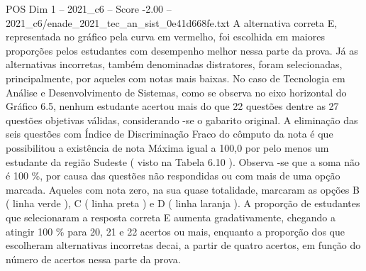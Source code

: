 \begin{textsample}{POS Dim 1 – 2021\_c6 – Score -2.00 – 2021\_c6/enade\_2021\_tec\_an\_sist\_0e41d668fe.txt}
A alternativa correta E, representada no gráfico pela curva em vermelho, foi escolhida em maiores proporções pelos estudantes com desempenho melhor nessa parte da prova.
Já as alternativas incorretas, também denominadas distratores, foram selecionadas, principalmente, por aqueles com notas mais baixas.
No caso de Tecnologia em Análise e Desenvolvimento de Sistemas, como se observa no eixo horizontal do Gráfico 6.5, nenhum estudante acertou mais do que 22 questões dentre as 27 questões objetivas válidas, considerando -se o gabarito original.
A eliminação das seis questões com Índice de Discriminação Fraco do cômputo da nota é que possibilitou a existência de nota Máxima igual a 100,0 por pelo menos um estudante da região Sudeste ( visto na Tabela 6.10 ).
Observa -se que a soma não é 100 \%, por causa das questões não respondidas ou com mais de uma opção marcada.
Aqueles com nota zero, na sua quase totalidade, marcaram as opções B ( linha verde ), C ( linha preta ) e D ( linha laranja ).
A proporção de estudantes que selecionaram a resposta correta E aumenta gradativamente, chegando a atingir 100 \% para 20, 21 e 22 acertos ou mais, enquanto a proporção dos que escolheram alternativas incorretas decai, a partir de quatro acertos, em função do número de acertos nessa parte da prova.

\end{textsample}
